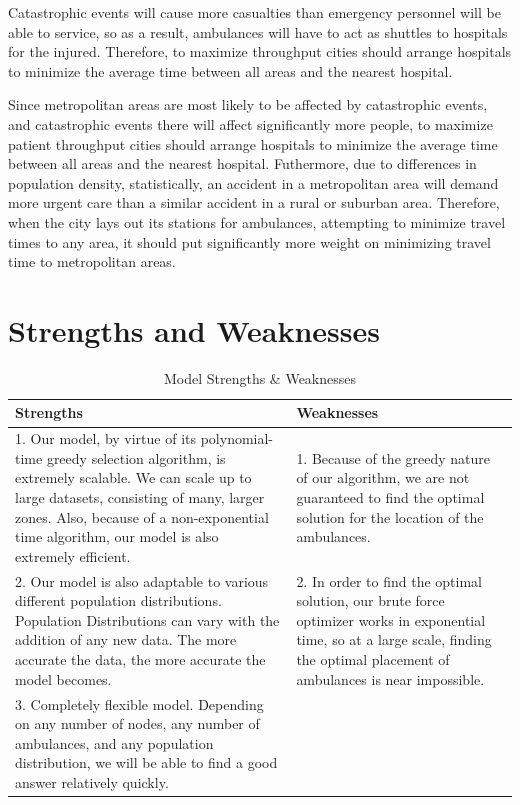 \documentclass[notitlepage, 12pt]{article}
\begin{document}
Catastrophic events will cause more casualties than emergency personnel will be able to service, so as a result,
ambulances will have to act as shuttles to hospitals for the injured. Therefore, to maximize throughput
cities should arrange hospitals to minimize the average time between all areas and the nearest
hospital.

Since metropolitan areas are most likely to be affected by catastrophic events, and catastrophic events there
will affect significantly more people, to maximize patient throughput cities should arrange hospitals to minimize
the average time between all areas and the nearest hospital. Futhermore, due to differences in population density,
statistically, an accident in a metropolitan area will demand more urgent care than a similar accident
in a rural or suburban area. Therefore, when the city lays out its stations for ambulances, attempting to minimize
travel times to any area, it should put significantly more weight on minimizing travel time to metropolitan areas.

\section{Strengths and Weaknesses}

\begin{table}[H]
    \centering
    \begin{tabular}{ p{6.25cm}|p{6.25cm} }
        \textbf{Strengths} & \textbf{Weaknesses}\\
        \hline
        1. Our model, by virtue of its polynomial-time greedy selection algorithm, is extremely scalable. We can scale up to large datasets, consisting of many, larger zones. Also, because of a non-exponential time algorithm, our model is also extremely efficient. & 1. Because of the greedy nature of our algorithm, we are not guaranteed to find the optimal solution for the location of the ambulances.\\
        2. Our model is also adaptable to various different population distributions. Population Distributions can vary with the addition of any new data. The more accurate the data, the more accurate the model becomes. & 2. In order to find the optimal solution, our brute force optimizer works in exponential time, so at a large scale, finding the optimal placement of ambulances is near impossible. \\
        3. Completely flexible model. Depending on any number of nodes, any number of ambulances, and any population distribution, we will be able to find a good answer relatively quickly.

    \end{tabular}
    \caption{Model Strengths \& Weaknesses}
    \label{tab:modelprocons}
\end{table}
\end{document}

